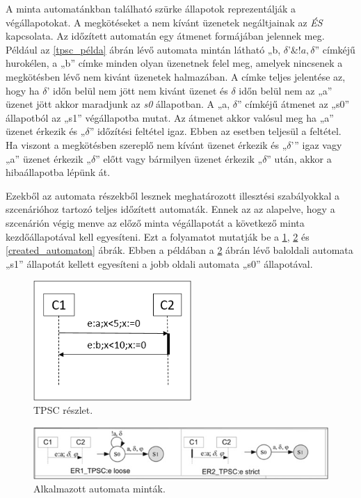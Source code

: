 A minta automatánkban található szürke állapotok reprezentálják a végállapotokat.
A megkötéseket a nem kívánt üzenetek negáltjainak az \textit{ÉS} kapcsolata.
Az időzített automatán egy átmenet formájában jelennek meg.
Például az \ref{tpsc_példa} ábrán lévő automata mintán látható „b, $\delta ’\&!a, \delta$” címkéjű hurokélen, a „b” címke minden olyan üzenetnek felel meg, amelyek nincsenek a megkötésben lévő nem kivánt üzenetek halmazában.
A címke teljes jelentése az, hogy ha $\delta$’ időn belül nem jött nem kivánt üzenet és $\delta$ időn belül nem az „a” üzenet jött akkor maradjunk az \textit{s0} állapotban.
A „a, $\delta$” címkéjű átmenet az „s0” állapotból az „s1” végállapotba mutat.
Az átmenet akkor valósul meg ha „a” üzenet érkezik és „$\delta$” időzítési feltétel igaz.
Ebben az esetben teljesül a feltétel.
Ha viszont a megkötésben szereplő nem kívánt üzenet érkezik és „$\delta$’” igaz vagy „a” üzenet érkezik „$\delta$” előtt vagy bármilyen üzenet érkezik „$\delta$” után, akkor a hibaállapotba lépünk át.

Ezekből az automata részekből lesznek meghatározott illesztési szabályokkal a szcenárióhoz tartozó teljes időzített automaták.
Ennek az az alapelve, hogy a szcenárión végig menve az előző minta végállapotát a következő minta kezdőállapotával kell egyesíteni.
Ezt a folyamatot mutatják be a \ref{tpsc_subset}, \ref{tpsc_used_patterns} és \ref{created_automaton} ábrák.
Ebben a példában a \ref{tpsc_used_patterns} ábrán lévő baloldali automata „s1” állapotát kellett egyesíteni a jobb oldali automata „s0” állapotával.

\begin{figure}[!ht]
    \centering
    \includegraphics[width=60mm, keepaspectratio]{figures/7abra.png}
    \caption{TPSC részlet.}
    \label{tpsc_subset}
\end{figure}

\begin{figure}[!ht]
    \centering
    \includegraphics[width=150mm, keepaspectratio]{figures/8abra.png}
    \caption{Alkalmazott automata minták.}
    \label{tpsc_used_patterns}
\end{figure}

